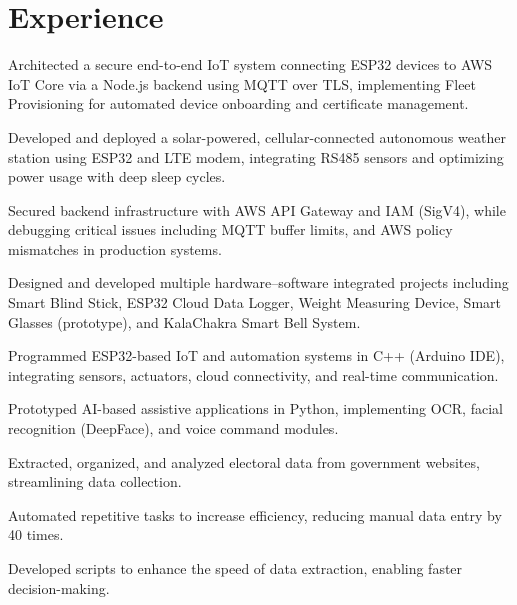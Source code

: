 \documentclass[]{plushcv}
\begin{document}
\begin{minipage}[t]{0.80\textwidth} 



\section{Experience}

\vspace{\topsep}
\begin{tightemize}
\sectionsep
\item Architected a secure end-to-end IoT system connecting ESP32 devices to AWS IoT Core via a Node.js backend using MQTT over TLS, implementing Fleet Provisioning for automated device onboarding and certificate management.
\item Developed and deployed a solar-powered, cellular-connected autonomous weather station using ESP32 and LTE modem, integrating RS485 sensors and optimizing power usage with deep sleep cycles.
\item Secured backend infrastructure with AWS API Gateway and IAM (SigV4), while debugging critical issues including MQTT buffer limits, and AWS policy mismatches in production systems.
\end{tightemize}
\sectionsep


\vspace{\topsep}
\begin{tightemize}
\sectionsep
\item Designed and developed multiple hardware–software integrated projects including Smart Blind Stick, ESP32 Cloud Data Logger, Weight Measuring Device, Smart Glasses (prototype), and KalaChakra Smart Bell System.
\item Programmed ESP32-based IoT and automation systems in C++ (Arduino IDE), integrating sensors, actuators, cloud connectivity, and real-time communication.
\item Prototyped AI-based assistive applications in Python, implementing OCR, facial recognition (DeepFace), and voice command modules.
\end{tightemize}
\sectionsep


\begin{tightemize}
\sectionsep
\item Extracted, organized, and analyzed electoral data from government websites, streamlining data collection.
\item Automated repetitive tasks to increase efficiency, reducing manual data entry by 40 times.
\item Developed scripts to enhance the speed of data extraction, enabling faster decision-making.
\end{tightemize}
\sectionsep



\end{minipage}
\end{document}
